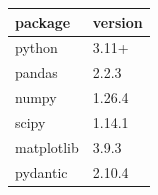 \begin{tabular}{ll}
\toprule
package & version \\
\midrule
python & 3.11+ \\
pandas & 2.2.3 \\
numpy & 1.26.4 \\
scipy & 1.14.1 \\
matplotlib & 3.9.3 \\
pydantic & 2.10.4 \\
\bottomrule
\end{tabular}
